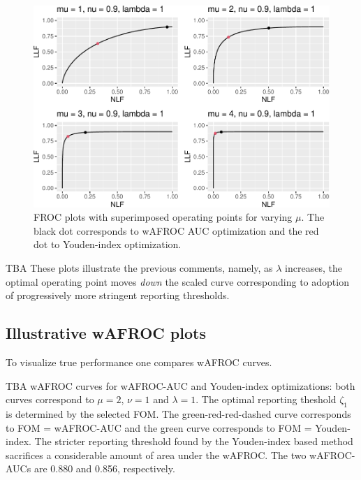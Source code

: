 \documentclass[
]{book}
\begin{document}
\begin{figure}
\centering
\includegraphics{21-optim-op-point_files/figure-latex/optim-op-point-vary-mu-froc-1.pdf}
\caption{\label{fig:optim-op-point-vary-mu-froc}FROC plots with superimposed operating points for varying \(\mu\). The black dot corresponds to wAFROC AUC optimization and the red dot to Youden-index optimization.}
\end{figure}

TBA These plots illustrate the previous comments, namely, as \(\lambda\) increases, the optimal operating point moves \emph{down} the scaled curve corresponding to adoption of progressively more stringent reporting thresholds.

\hypertarget{illustrative-wafroc-plots-1}{%
\subsection{Illustrative wAFROC plots}\label{illustrative-wafroc-plots-1}}

To visualize true performance one compares wAFROC curves.

TBA wAFROC curves for wAFROC-AUC and Youden-index optimizations: both curves correspond to \(\mu = 2\), \(\nu = 1\) and \(\lambda = 1\). The optimal reporting theshold \(\zeta_1\) is determined by the selected FOM. The green-red-red-dashed curve corresponds to FOM = wAFROC-AUC and the green curve corresponds to FOM = Youden-index. The stricter reporting threshold found by the Youden-index based method sacrifices a considerable amount of area under the wAFROC. The two wAFROC-AUCs are 0.880 and 0.856, respectively.
\end{document}

